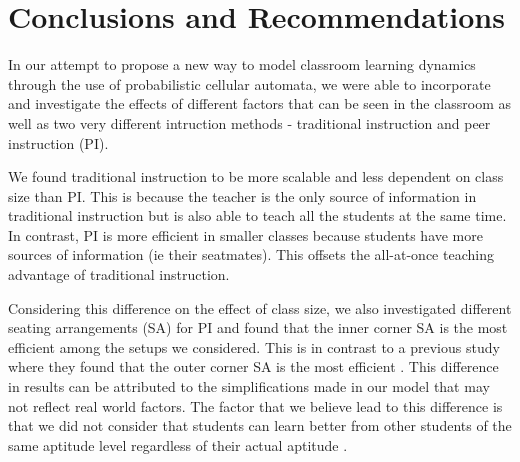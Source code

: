 \chapter{Conclusions and Recommendations}

In our attempt to propose a new way to model classroom learning dynamics through the use of probabilistic cellular automata, we were able to incorporate and investigate the effects of different factors that can be seen in the classroom as well as two very different intruction methods - traditional instruction and peer instruction (PI).

We found traditional instruction to be more scalable and less dependent on class size than PI.
This is because the teacher is the only source of information in traditional instruction but is also able to teach all the students at the same time.
In contrast, PI is more efficient in smaller classes because students have more sources of information (ie their seatmates). 
This offsets the all-at-once teaching advantage of traditional instruction.

Considering this difference on the effect of class size, we also investigated different seating arrangements (SA) for PI and found that the inner corner SA is the most efficient among the setups we considered.
This is in contrast to a previous study where they found that the outer corner SA is the most efficient \cite{roxas2010seating}.
This difference in results can be attributed to the simplifications made in our model that may not reflect real world factors.
The factor that we believe lead to this difference is that we did not consider that students can learn better from other students of the same aptitude level regardless of their actual aptitude \cite{smith2009peer}.


